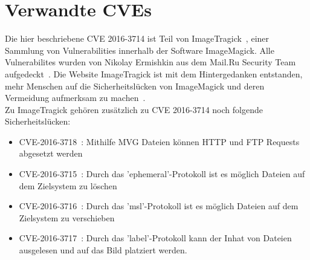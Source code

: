 \newpage
\section{Verwandte CVEs}\label{sec:verwandte-cves}

Die hier beschriebene CVE 2016-3714 ist Teil von ImageTragick~\cite{ImageTragick}, einer Sammlung von Vulnerabilities
innerhalb der Software ImageMagick.
Alle Vulnerabilites wurden von Nikolay Ermishkin aus dem Mail.Ru Security Team aufgedeckt~\cite{ImageTragick}.
Die Website ImageTragick ist mit dem Hintergedanken entstanden,
mehr Menschen auf die Sicherheitslücken von ImageMagick und deren Vermeidung aufmerksam zu machen~\cite{ImageTragick}.\\

Zu ImageTragick gehören zusätzlich zu CVE 2016-3714 noch folgende Sicherheitslücken:

\begin{itemize}
    \item CVE-2016-3718~\cite{CVE20163718HTTPFTP}: Mithilfe MVG Dateien können HTTP und FTP Requests abgesetzt werden
    \item CVE-2016-3715~\cite{CVE20163715EPHEMERALCoder}: Durch das 'ephemeral'-Protokoll ist es möglich Dateien auf dem Zielsystem zu löschen
    \item CVE-2016-3716~\cite{CVE20163716MSLCoder}: Durch das 'msl'-Protokoll ist es möglich Dateien auf dem Zielsystem zu verschieben
    \item CVE-2016-3717~\cite{CVE20163717LABELCoder}: Durch das 'label'-Protokoll kann der Inhat von Dateien ausgelesen und auf das Bild platziert werden.
\end{itemize}
